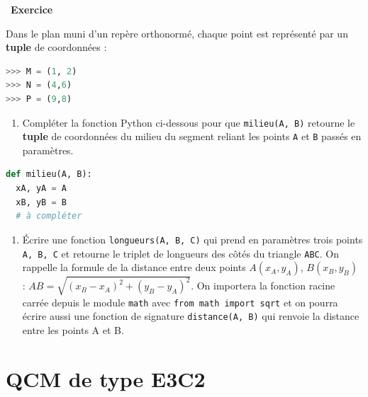 \documentclass[
  11pt,
]{article}
\newcommand{\passthrough}[1]{#1}
\providecommand{\tightlist}{%
  \setlength{\itemsep}{0pt}\setlength{\parskip}{0pt}}
\newcounter{exo}
\newenvironment{exercice}[1]
{\par \medskip   \addtocounter{exo}{1} \noindent  
\begin{bclogo}[arrondi =0.1,   noborder = true, logo=\bccrayon, marge=4]{~\textbf{Exercice} \textbf{\theexo} {\itshape #1} }  \par}
{
\end{bclogo}
 \par \bigskip }
\newcounter{def}
\begin{document}
\begin{exercice}{}

Dans le plan muni d'un repère orthonormé, chaque point est représenté
par un \textbf{tuple} de coordonnées :

\begin{lstlisting}[language=Python]
>>> M = (1, 2)
>>> N = (4,6)
>>> P = (9,8)
\end{lstlisting}

\begin{enumerate}
\def\labelenumi{\arabic{enumi}.}
\tightlist
\item
  Compléter la fonction Python ci-dessous pour que
  \passthrough{\lstinline!milieu(A, B)!} retourne le \textbf{tuple} de
  coordonnées du milieu du segment reliant les points
  \passthrough{\lstinline!A!} et \passthrough{\lstinline!B!} passés en
  paramètres.
\end{enumerate}

\begin{lstlisting}[language=Python]
def milieu(A, B):
  xA, yA = A
  xB, yB = B
  # à compléter
\end{lstlisting}

\begin{enumerate}
\def\labelenumi{\arabic{enumi}.}
\setcounter{enumi}{1}
\tightlist
\item
  Écrire une fonction \passthrough{\lstinline!longueurs(A, B, C)!} qui
  prend en paramètres trois points \passthrough{\lstinline!A, B, C!} et
  retourne le triplet de longueurs des côtés du triangle
  \passthrough{\lstinline!ABC!}. On rappelle la formule de la distance
  entre deux points \(A(x_{A}, y_{A})\), \(B(x_{B}, y_{B})\) :
  \(AB=\sqrt{(x_{B}-x_{A})^{2}+(y_{B}-y_{A})^{2}}\). On importera la
  fonction racine carrée depuis le module \passthrough{\lstinline!math!}
  avec \passthrough{\lstinline!from math import sqrt!} et on pourra
  écrire aussi une fonction de signature
  \passthrough{\lstinline!distance(A, B)!} qui renvoie la distance entre
  les points A et B.
\end{enumerate}

\end{exercice}

\hypertarget{qcm-de-type-e3c2}{%
\section{QCM de type E3C2}\label{qcm-de-type-e3c2}}
\end{document}
